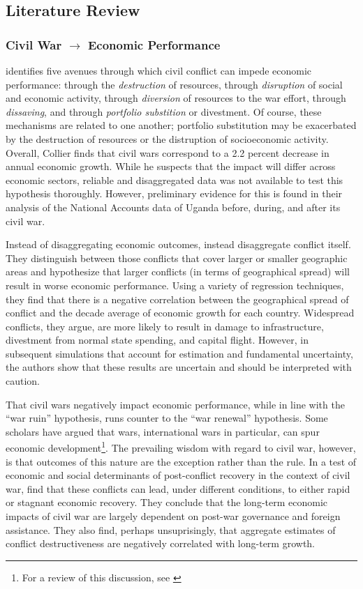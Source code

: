 \subsection{Literature Review}
\label{lit}

\subsubsection{Civil War $\rightarrow$ Economic Performance}

\cite{collier:1999} identifies five avenues through which civil conflict can impede economic performance: through the \textit{destruction} of resources, through \textit{disruption} of social and economic activity, through \textit{diversion} of resources to the war effort, through \textit{dissaving}, and through \textit{portfolio substition} or divestment.  Of course, these mechanisms are related to one another; portfolio substitution may be exacerbated by the destruction of resources or the distruption of socioeconomic activity.  Overall, Collier finds that civil wars correspond to a 2.2 percent decrease in annual economic growth.  While he suspects that the impact will differ across economic sectors, reliable and disaggregated data was not available to test this hypothesis thoroughly.  However, preliminary evidence for this is found in their analysis of the National Accounts data of Uganda before, during, and after its civil war.

Instead of disaggregating economic outcomes, \cite{imai:weinstein:2000} instead disaggregate conflict itself.  They distinguish between those conflicts that cover larger or smaller geographic areas and hypothesize that larger conflicts (in terms of geographical spread) will result in worse economic performance.  Using a variety of regression techniques, they find that there is a negative correlation between the geographical spread of conflict and the decade average of economic growth for each country.  Widespread conflicts, they argue, are more likely to result in damage to infrastructure, divestment from normal state spending, and capital flight.  However, in subsequent simulations that account for estimation and fundamental uncertainty, the authors show that these results are uncertain and should be interpreted with caution.

That civil wars negatively impact economic performance, while in line with the ``war ruin'' hypothesis, runs counter to the ``war renewal'' hypothesis.  Some scholars have argued that wars, international wars in particular, can spur economic development\footnote{For a review of this discussion, see \cite{rasler:thompson:1985}}.  The prevailing wisdom with regard to civil war, however, is that outcomes of this nature are the exception rather than the rule.  In a test of economic and social determinants of post-conflict recovery in the context of civil war, \cite{kang:meernik:2005} find that these conflicts can lead, under different conditions, to either rapid or stagnant economic recovery.  They conclude that the long-term economic impacts of civil war are largely dependent on post-war governance and foreign assistance.  They also find, perhaps unsuprisingly, that aggregate estimates of conflict destructiveness are negatively correlated with long-term growth.

